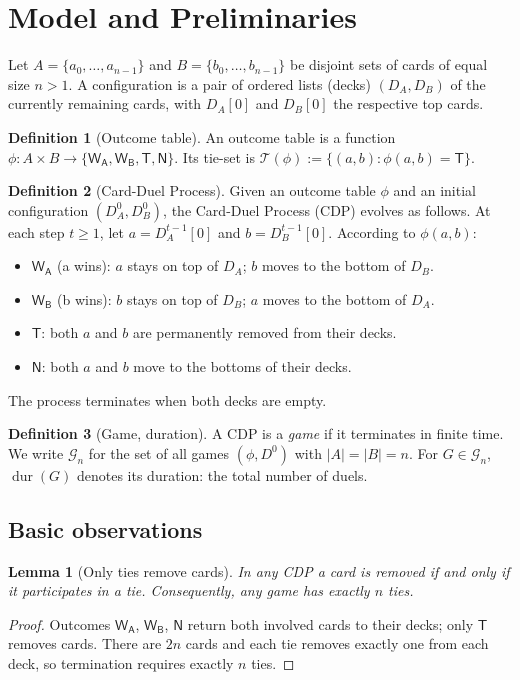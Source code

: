 \documentclass[11pt]{article}
\newtheorem{lemma}{Lemma}
\theoremstyle{definition}
\newtheorem{definition}{Definition}
\theoremstyle{remark}
\DeclareMathOperator{\dur}{dur}
\newcommand{\WA}{\mathsf{W_A}}
\newcommand{\WB}{\mathsf{W_B}}
\newcommand{\TT}{\mathsf{T}}
\newcommand{\NN}{\mathsf{N}}
\begin{document}
\section{Model and Preliminaries}\label{sec:model}
Let $A=\{a_0,\dots,a_{n-1}\}$ and $B=\{b_0,\dots,b_{n-1}\}$ be disjoint sets of cards of equal size $n > 1$. A configuration is a pair of ordered lists (decks) $(D_A,D_B)$ of the currently remaining cards, with $D_A[0]$ and $D_B[0]$ the respective top cards.

\begin{definition}[Outcome table] An outcome table is a function $\phi:A\times B\rightarrow\{\WA,\WB,\TT,\NN\}$. Its tie-set is $\mathcal{T}(\phi):=\{(a,b):\phi(a,b)=\TT\}$.
\end{definition}

\begin{definition}[Card-Duel Process] Given an outcome table $\phi$ and an initial configuration $(D_A^0,D_B^0)$, the Card-Duel Process (CDP) evolves as follows. At each step $t\ge 1$, let $a=D_A^{t-1}[0]$ and $b=D_B^{t-1}[0]$. According to $\phi(a,b)$:
\begin{itemize}[nosep]
    \item $\WA$ (a wins): $a$ stays on top of $D_A$; $b$ moves to the bottom of $D_B$.
    \item $\WB$ (b wins): $b$ stays on top of $D_B$; $a$ moves to the bottom of $D_A$.
    \item $\TT$: both $a$ and $b$ are permanently removed from their decks.
    \item $\NN$: both $a$ and $b$ move to the bottoms of their decks.
\end{itemize}
The process terminates when both decks are empty.
\end{definition}

\begin{definition}[Game, duration] A CDP is a \emph{game} if it terminates in finite time. We write $\mathcal{G}_n$ for the set of all games $(\phi,D^0)$ with $|A|=|B|=n$. For $G\in\mathcal{G}_n$, $\dur(G)$ denotes its duration: the total number of duels.
\end{definition}

\subsection{Basic observations}
\begin{lemma}[Only ties remove cards] In any CDP a card is removed if and only if it participates in a tie. Consequently, any game has exactly $n$ ties.
\end{lemma}
\begin{proof}
Outcomes $\WA$, $\WB$, $\NN$ return both involved cards to their decks; only $\TT$ removes cards. There are $2n$ cards and each tie removes exactly one from each deck, so termination requires exactly $n$ ties.
\end{proof}
\end{document}
